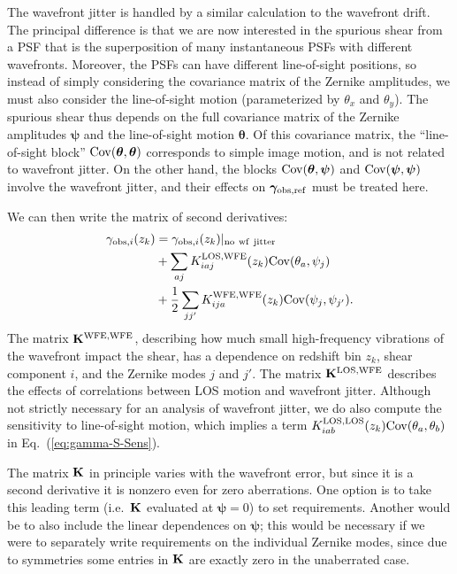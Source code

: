 \documentclass[usenatbib]{mnras}
\begin{document}
The wavefront jitter is handled by a similar calculation to the
wavefront drift. The principal difference is that we are now
interested in the spurious shear from a PSF that is the superposition
of many instantaneous PSFs with different wavefronts. Moreover, the
PSFs can have different line-of-sight positions, so instead of simply
considering the covariance matrix of the Zernike amplitudes, we must
also consider the line-of-sight motion (parameterized by $\theta_x$
and $\theta_y$). The spurious shear thus depends on the full
covariance matrix of the Zernike amplitudes ${\boldsymbol\psi}$ and
the line-of-sight motion ${\boldsymbol\theta}$. Of this covariance
matrix, the ``line-of-sight block'' ${\rm
Cov}({\boldsymbol\theta},{\boldsymbol\theta})$ corresponds to simple
image motion, and is not related to wavefront jitter. On the other
hand, the blocks ${\rm Cov}({\boldsymbol\theta},{\boldsymbol\psi})$
and ${\rm Cov}({\boldsymbol\psi},{\boldsymbol\psi})$ involve the
wavefront jitter, and their effects on ${\boldsymbol\gamma}_{\rm
obs,ref}$ must be treated here.

We can then write the matrix of second derivatives:
\begin{align}
\gamma_{{\rm obs},i}(z_k) &= \gamma_{{\rm obs},i}(z_k)|_{\rm no~wf~jitter}\nonumber\\
&+ \sum_{aj} K^{\rm LOS,WFE}_{iaj}(z_k) {\rm Cov}({\theta}_a,{\psi}_j)\nonumber\\
&+ \frac12 \sum_{jj'} K^{\rm WFE,WFE}_{ija}(z_k) {\rm Cov}({\psi}_j,{\psi}_{j'}).
\label{eq:gamma-S-Sens}
\end{align}
The matrix ${\bf K}^{\rm WFE,WFE}$, describing how much small
high-frequency vibrations of the wavefront impact the shear, has a
dependence on redshift bin $z_k$, shear component $i$, and the Zernike
modes $j$ and $j'$. The matrix ${\bf K}^{\rm LOS,WFE}$ describes the
effects of correlations between LOS motion and wavefront jitter.
Although not strictly necessary for an analysis of wavefront jitter, we do also compute the sensitivity to line-of-sight motion, which implies a term $K^{\rm LOS,LOS}_{iab}(z_k) {\rm Cov}({\theta}_a,{\theta}_b)$ in Eq.~(\ref{eq:gamma-S-Sens}).

The matrix ${\bf K}$ in principle varies with the wavefront error, but
since it is a second derivative it is nonzero even for zero
aberrations. One option is to take this leading term (i.e.\ ${\bf K}$
evaluated at ${\boldsymbol\psi}=0$) to set requirements. Another would
be to also include the linear dependences on ${\boldsymbol\psi}$; this
would be necessary if we were to separately write requirements on the
individual Zernike modes, since due to symmetries some entries in
${\bf K}$ are exactly zero in the unaberrated case.
\end{document}
